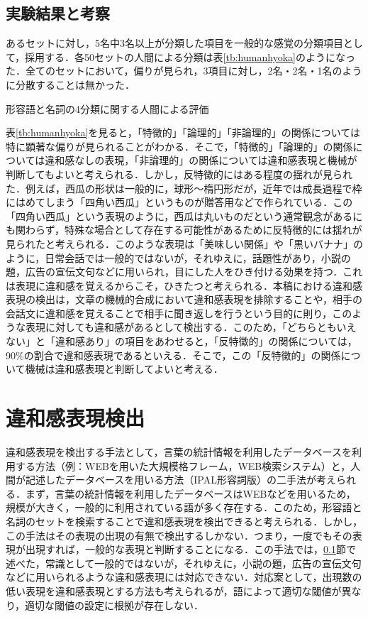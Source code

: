 \documentclass[japanese]{jnlp_1.4}
\begin{document}
\subsection{実験結果と考察}\label{sec:humanjikkenkekka}

あるセットに対し，5名中3名以上が分類した項目を一般的な感覚の分類項目として，採用する．各50セットの人間による分類は表\ref{tb:humanhyoka}のようになった．全てのセットにおいて，偏りが見られ，3項目に対し，2名・2名・1名のように分散することは無かった．

\begin{table}[t]
	\caption{形容語と名詞の4分類に関する人間による評価}
	\label{tb:humanhyoka}

\end{table}

表\ref{tb:humanhyoka}を見ると，「特徴的」「論理的」「非論理的」の関係については特に顕著な偏りが見られることがわかる．そこで，「特徴的」「論理的」の関係については違和感なしの表現，「非論理的」の関係については違和感表現と機械が判断してもよいと考えられる．しかし，反特徴的にはある程度の揺れが見られた．例えば，西瓜の形状は一般的に，球形〜楕円形だが，近年では成長過程で枠にはめてしまう「四角い西瓜」というものが贈答用などで作られている．この「四角い西瓜」という表現のように，西瓜は丸いものだという通常観念があるにも関わらず，特殊な場合として存在する可能性があるために反特徴的には揺れが見られたと考えられる．このような表現は「美味しい関係」や「黒いバナナ」のように，日常会話では一般的ではないが，それゆえに，話題性があり，小説の題，広告の宣伝文句などに用いられ，目にした人をひき付ける効果を持つ．これは表現に違和感を覚えるからこそ，ひきたつと考えられる．本稿における違和感表現の検出は，文章の機械的合成において違和感表現を排除することや，相手の会話文に違和感を覚えることで相手に聞き返しを行うという目的に則り，このような表現に対しても違和感があるとして検出する．このため，「どちらともいえない」と「違和感あり」の項目をあわせると，「反特徴的」の関係については，90\%の割合で違和感表現であるといえる．そこで，この「反特徴的」の関係について機械は違和感表現と判断してよいと考える．


\section{違和感表現検出}\label{sec:Hijyoshiki}

違和感表現を検出する手法として，言葉の統計情報を利用したデータベースを利用する方法（例：WEBを用いた大規模格フレーム，WEB検索システム）と，人間が記述したデータベースを用いる方法（IPAL形容詞版\cite{iPAL1990}）の二手法が考えられる．まず，言葉の統計情報を利用したデータベースはWEBなどを用いるため，規模が大きく，一般的に利用されている語が多く存在する．このため，形容語と名詞のセットを検索することで違和感表現を検出できると考えられる．しかし，この手法はその表現の出現の有無で検出するしかない．つまり，一度でもその表現が出現すれば，一般的な表現と判断することになる．この手法では，\ref{sec:humanjikkenkekka}節で述べた，常識として一般的ではないが，それゆえに，小説の題，広告の宣伝文句などに用いられるような違和感表現には対応できない．対応案として，出現数の低い表現を違和感表現とする方法も考えられるが，語によって適切な閾値が異なり，適切な閾値の設定に根拠が存在しない．
\end{document}
